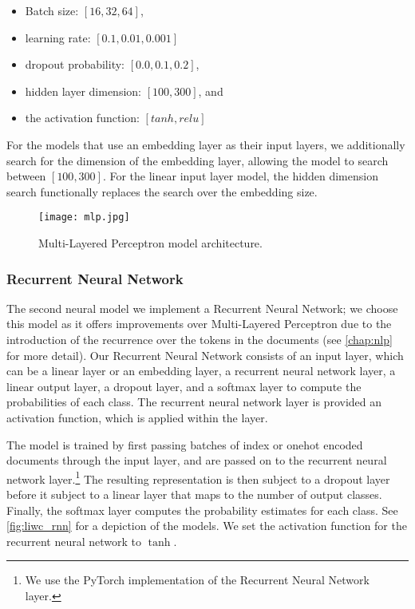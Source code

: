\begin{itemize}
  \item Batch size: $[16, 32, 64]$,
  \item learning rate: $[0.1, 0.01, 0.001]$
  \item dropout probability: $[0.0, 0.1, 0.2]$,
  \item hidden layer dimension: $[100, 300]$, and
  \item the activation function: $[tanh, relu]$
\end{itemize}

For the models that use an embedding layer as their input layers, we additionally search for the dimension of the embedding layer, allowing the model to search between $[100, 300]$. For the linear input layer model, the hidden dimension search functionally replaces the search over the embedding size.

\begin{figure}
  \centering
  \texttt{[image: mlp.jpg]}
  \caption{Multi-Layered Perceptron model architecture.}
  \label{fig:liwc_mlp}
\end{figure}


\subsubsection{Recurrent Neural Network}

The second neural model we implement a Recurrent Neural Network; we choose this model as it offers improvements over Multi-Layered Perceptron due to the introduction of the recurrence over the tokens in the documents (see \autoref{chap:nlp} for more detail). Our Recurrent Neural Network consists of an input layer, which can be a linear layer or an embedding layer, a recurrent neural network layer, a linear output layer, a dropout layer, and a softmax layer to compute the probabilities of each class. The recurrent neural network layer is provided an activation function, which is applied within the layer. 

The model is trained by first passing batches of index or onehot encoded documents through the input layer, and are passed on to the recurrent neural network layer.\footnote{We use the PyTorch implementation of the Recurrent Neural Network layer.} The resulting representation is then subject to a dropout layer before it subject to a linear layer that maps to the number of output classes. Finally, the softmax layer computes the probability estimates for each class. See \autoref{fig:liwc_rnn} for a depiction of the models. We set the activation function for the recurrent neural network to $\tanh$.

